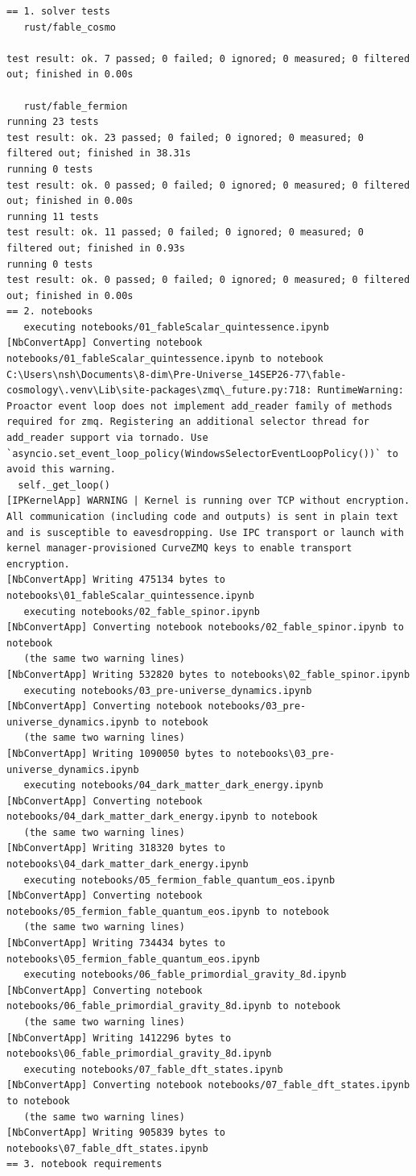\begin{Verbatim}
== 1. solver tests
   rust/fable_cosmo

test result: ok. 7 passed; 0 failed; 0 ignored; 0 measured; 0 filtered out; finished in 0.00s

   rust/fable_fermion
running 23 tests
test result: ok. 23 passed; 0 failed; 0 ignored; 0 measured; 0 filtered out; finished in 38.31s
running 0 tests
test result: ok. 0 passed; 0 failed; 0 ignored; 0 measured; 0 filtered out; finished in 0.00s
running 11 tests
test result: ok. 11 passed; 0 failed; 0 ignored; 0 measured; 0 filtered out; finished in 0.93s
running 0 tests
test result: ok. 0 passed; 0 failed; 0 ignored; 0 measured; 0 filtered out; finished in 0.00s
== 2. notebooks
   executing notebooks/01_fableScalar_quintessence.ipynb
[NbConvertApp] Converting notebook notebooks/01_fableScalar_quintessence.ipynb to notebook
C:\Users\nsh\Documents\8-dim\Pre-Universe_14SEP26-77\fable-cosmology\.venv\Lib\site-packages\zmq\_future.py:718: RuntimeWarning: Proactor event loop does not implement add_reader family of methods required for zmq. Registering an additional selector thread for add_reader support via tornado. Use `asyncio.set_event_loop_policy(WindowsSelectorEventLoopPolicy())` to avoid this warning.
  self._get_loop()
[IPKernelApp] WARNING | Kernel is running over TCP without encryption. All communication (including code and outputs) is sent in plain text and is susceptible to eavesdropping. Use IPC transport or launch with kernel manager-provisioned CurveZMQ keys to enable transport encryption.
[NbConvertApp] Writing 475134 bytes to notebooks\01_fableScalar_quintessence.ipynb
   executing notebooks/02_fable_spinor.ipynb
[NbConvertApp] Converting notebook notebooks/02_fable_spinor.ipynb to notebook
   (the same two warning lines)
[NbConvertApp] Writing 532820 bytes to notebooks\02_fable_spinor.ipynb
   executing notebooks/03_pre-universe_dynamics.ipynb
[NbConvertApp] Converting notebook notebooks/03_pre-universe_dynamics.ipynb to notebook
   (the same two warning lines)
[NbConvertApp] Writing 1090050 bytes to notebooks\03_pre-universe_dynamics.ipynb
   executing notebooks/04_dark_matter_dark_energy.ipynb
[NbConvertApp] Converting notebook notebooks/04_dark_matter_dark_energy.ipynb to notebook
   (the same two warning lines)
[NbConvertApp] Writing 318320 bytes to notebooks\04_dark_matter_dark_energy.ipynb
   executing notebooks/05_fermion_fable_quantum_eos.ipynb
[NbConvertApp] Converting notebook notebooks/05_fermion_fable_quantum_eos.ipynb to notebook
   (the same two warning lines)
[NbConvertApp] Writing 734434 bytes to notebooks\05_fermion_fable_quantum_eos.ipynb
   executing notebooks/06_fable_primordial_gravity_8d.ipynb
[NbConvertApp] Converting notebook notebooks/06_fable_primordial_gravity_8d.ipynb to notebook
   (the same two warning lines)
[NbConvertApp] Writing 1412296 bytes to notebooks\06_fable_primordial_gravity_8d.ipynb
   executing notebooks/07_fable_dft_states.ipynb
[NbConvertApp] Converting notebook notebooks/07_fable_dft_states.ipynb to notebook
   (the same two warning lines)
[NbConvertApp] Writing 905839 bytes to notebooks\07_fable_dft_states.ipynb
== 3. notebook requirements


\end{Verbatim}
